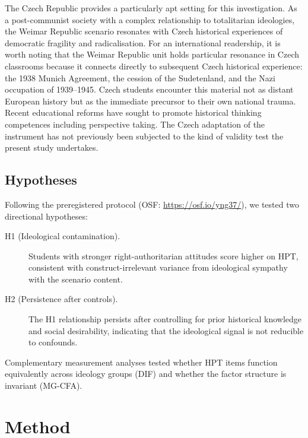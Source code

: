 \documentclass[pdflatex,sn-apa]{sn-jnl}%
\begin{document}
The Czech Republic provides a particularly apt setting for this investigation. As a post-communist society with a complex relationship to totalitarian ideologies, the Weimar Republic scenario resonates with Czech historical experiences of democratic fragility and radicalisation. For an international readership, it is worth noting that the Weimar Republic unit holds particular resonance in Czech classrooms because it connects directly to subsequent Czech historical experience: the 1938 Munich Agreement, the cession of the Sudetenland, and the Nazi occupation of 1939--1945. Czech students encounter this material not as distant European history but as the immediate precursor to their own national trauma. Recent educational reforms have sought to promote historical thinking competences including perspective taking. The Czech adaptation of the \citet{Hartmann2008} instrument has not previously been subjected to the kind of validity test the present study undertakes.

\subsection{Hypotheses}\label{subsec:hypotheses}

Following the preregistered protocol (OSF: \url{https://osf.io/yng37/}), we tested two directional hypotheses:

\begin{description}
\item[H1 (Ideological contamination).] Students with stronger right-authoritarian attitudes score higher on HPT, consistent with construct-irrelevant variance from ideological sympathy with the scenario content.
\item[H2 (Persistence after controls).] The H1 relationship persists after controlling for prior historical knowledge and social desirability, indicating that the ideological signal is not reducible to confounds.
\end{description}

Complementary measurement analyses tested whether HPT items function equivalently across ideology groups (DIF) and whether the factor structure is invariant (MG-CFA).


\section{Method}\label{sec:method}
\end{document}
